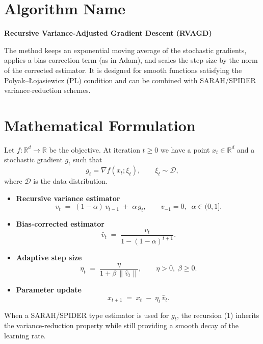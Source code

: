 \documentclass[11pt]{article}
\newcommand{\norm}[1]{\left\lVert#1\right\rVert}
\newcommand{\grad}{\nabla}
\begin{document}
\section*{Algorithm Name}
\textbf{Recursive Variance‑Adjusted Gradient Descent (RVAGD)}  

The method keeps an exponential moving average of the stochastic gradients, applies a bias‑correction term (as in Adam), and scales the step size by the norm of the corrected estimator.  It is designed for smooth functions satisfying the Polyak–Łojasiewicz (PL) condition and can be combined with SARAH/SPIDER variance‑reduction schemes.

\section*{Mathematical Formulation}
Let $f:\mathbb{R}^d\to\mathbb{R}$ be the objective.  
At iteration $t\ge 0$ we have a point $x_t\in\mathbb{R}^d$ and a stochastic gradient $g_t$ such that
\[
g_t = \grad f(x_t;\xi_t),\qquad \xi_t\sim\mathcal{D},
\]
where $\mathcal{D}$ is the data distribution.  

\begin{itemize}
    \item \textbf{Recursive variance estimator}
    \[
    v_t \;=\;(1-\alpha)\,v_{t-1}\;+\;\alpha\, g_t,\qquad v_{-1}=0,\;\; \alpha\in(0,1].
    \tag{1}
    \]
    \item \textbf{Bias‑corrected estimator}
    \[
    \hat v_t \;=\; \frac{v_t}{1-(1-\alpha)^{t+1}}.
    \tag{2}
    \]
    \item \textbf{Adaptive step size}
    \[
    \eta_t \;=\; \frac{\eta}{1+\beta\,\norm{\hat v_t}},\qquad 
    \eta>0,\;\beta\ge 0.
    \tag{3}
    \]
    \item \textbf{Parameter update}
    \[
    x_{t+1}\;=\;x_t\;-\;\eta_t\,\hat v_t .
    \tag{4}
    \]
\end{itemize}
When a SARAH/SPIDER type estimator is used for $g_t$, the recursion (1) inherits the variance‑reduction property while still providing a smooth decay of the learning rate.
\end{document}
